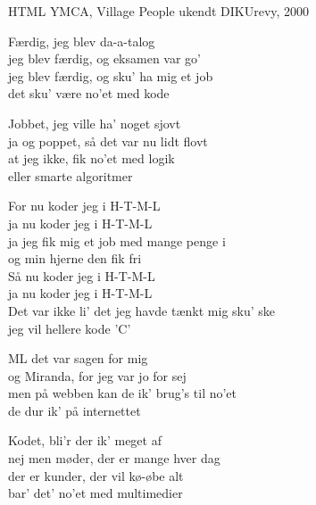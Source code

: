 \begin{song}{HTML}
  {} %
  {YMCA, Village People} %
  {ukendt} %
  {DIKUrevy, 2000} %
  {\NotCCLIed} %

  \begin{SBVerse}
    Færdig, jeg blev da-a-talog\\
    jeg blev færdig, og eksamen var go'\\
    jeg blev færdig, og sku' ha mig et job\\
    det sku' være no'et med kode
  \end{SBVerse}

  \begin{SBVerse}
    Jobbet, jeg ville ha' noget sjovt\\
    ja og poppet, så det var nu lidt flovt\\
    at jeg ikke, fik no'et med logik\\
    eller smarte algoritmer
  \end{SBVerse}

  \begin{SBChorus}
    For nu koder jeg i H-T-M-L\\
    ja nu koder jeg i H-T-M-L\\
    ja jeg fik mig et job med mange penge i\\
    og min hjerne den fik fri\\\medskip
    Så nu koder jeg i H-T-M-L\\
    ja nu koder jeg i H-T-M-L\\
    Det var ikke li' det jeg havde tænkt mig sku' ske\\
    jeg vil hellere kode 'C'
  \end{SBChorus}

  \begin{SBVerse}
    ML det var sagen for mig\\
    og Miranda, for jeg var jo for sej\\
    men på webben kan de ik' brug's til no'et\\
    de dur ik' på internettet
  \end{SBVerse}

  \begin{SBVerse}
    Kodet, bli'r der ik' meget af\\
    nej men møder, der er mange hver dag\\
    der er kunder, der vil kø-øbe alt\\
    bar' det' no'et med multimedier
  \end{SBVerse}


\end{song}
